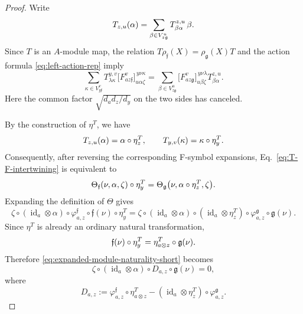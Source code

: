 \documentclass[a4paper,11pt]{article}
\theoremstyle{definition}
\theoremstyle{remark}
\newcommand{\id}{\operatorname{id}}
\begin{document}
\begin{proof}
Write
\begin{equation}
    \notag
    T_{z,u}(\alpha)
    =
    \sum_{\beta\in V^u_{z\mathfrak g}}
    T^{z,u}_{\beta\alpha}\,\beta. 
\end{equation}
Since $T$ is an $A$-module map, the relation $T\rho_{\mathfrak f}(X) = \rho_{\mathfrak g}(X)T$ and the action formula \eqref{eq:left-action-rep} imply
\begin{equation}
    \sum_{\kappa\in V^v_{y\mathfrak f}}
    T^{y,v}_{\lambda\kappa}
    \bigl[F^v_{az\mathfrak f}\bigr]
     ^{\,y\nu\kappa}_{u\alpha\zeta}
    =
    \sum_{\beta\in V^u_{z\mathfrak g}}
    \bigl[F^v_{az\mathfrak g}\bigr]
     ^{\,y\nu\lambda}_{u\beta\zeta}
    T^{z,u}_{\beta\alpha}.
    \label{eq:T-F-intertwining}
\end{equation}
Here the common factor $\sqrt{{d_a d_z}/{d_y}}$ on the two sides has canceled.

By the construction of $\eta^T$, we have
\begin{equation}
    \notag
    T_{z,u}(\alpha)=\alpha\circ\eta_z^T,
    \qquad
    T_{y,v}(\kappa)=\kappa\circ\eta_y^T. 
\end{equation}
Consequently, after reversing the corresponding F-symbol
expansions, Eq.~\eqref{eq:T-F-intertwining} is equivalent to
\begin{equation}
    \notag
    \Theta_{\mathfrak f}(\nu,\alpha,\zeta)
    \circ\eta_y^T
    =
    \Theta_{\mathfrak g}
    \bigl(\nu,\alpha\circ\eta_z^T,\zeta\bigr). 
\end{equation}
Expanding the definition of $\Theta$ gives
\begin{equation}
    \zeta \circ (\id_a\otimes\alpha) \circ \varphi^{\mathfrak f}_{a,z} \circ \mathfrak f(\nu) \circ \eta_y^T = \zeta \circ (\id_a\otimes\alpha) \circ (\id_a\otimes\eta_z^T) \circ \varphi^{\mathfrak g}_{a,z} \circ \mathfrak g(\nu). \label{eq:expanded-module-naturality-short}
\end{equation}
Since $\eta^T$ is already an ordinary natural transformation,
\begin{equation}
    \notag
    \mathfrak f(\nu)\circ\eta_y^T = \eta_{a\otimes z}^T\circ\mathfrak g(\nu).
\end{equation}
Therefore \eqref{eq:expanded-module-naturality-short} becomes
\begin{equation}
    \zeta\circ(\id_a\otimes\alpha)\circ D_{a,z}\circ\mathfrak g(\nu) = 0,\label{eq:D-tested-short}
\end{equation}
where
\begin{equation*}
    D_{a,z} := \varphi^{\mathfrak f}_{a,z} \circ \eta_{a\otimes z}^T - (\id_a\otimes\eta_z^T) \circ \varphi^{\mathfrak g}_{a,z}. 
\end{equation*}


\end{proof}
\end{document}
